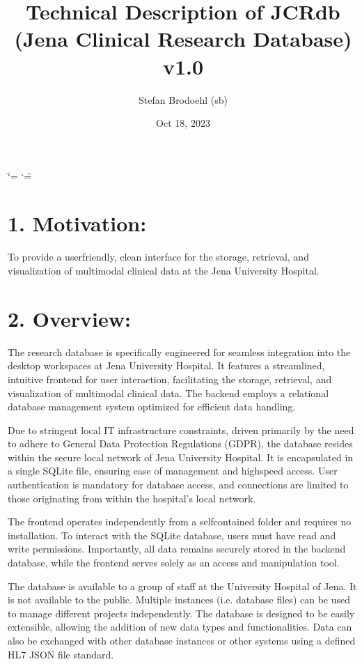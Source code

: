 \documentclass[a4paper,10pt,english]{sphinxmanual}
\title{Technical Description of JCRdb (Jena Clinical Research Database) v1.0}
\date{Oct 18, 2023}
\author{Stefan Brodoehl (sb)}
\begin{document}
\ifdefined\shorthandoff
  \ifnum\catcode`\=\string=\active\shorthandoff{=}\fi
  \ifnum\catcode`\"=\active{}\fi
\fi

\pagestyle{empty}
\sphinxmaketitle
\pagestyle{plain}
\sphinxtableofcontents
\pagestyle{normal}
\label{\detokenize{index::doc}}
\sphinxstepscope




\chapter{1. Motivation:}
\label{\detokenize{TechnicalDetails:motivation}}
\sphinxAtStartPar
To provide a user\sphinxhyphen{}friendly, clean interface for the storage, retrieval, and visualization of multimodal clinical data at the Jena University Hospital.


\chapter{2. Overview:}
\label{\detokenize{TechnicalDetails:overview}}
\sphinxAtStartPar
The research database is specifically engineered for seamless integration into the desktop workspaces at Jena University Hospital. It features a streamlined, intuitive frontend for user interaction, facilitating the storage, retrieval, and visualization of multimodal clinical data. The backend employs a relational database management system optimized for efficient data handling.

\sphinxAtStartPar
Due to stringent local IT infrastructure constraints, driven primarily by the need to adhere to General Data Protection Regulations (GDPR), the database resides within the secure local network of Jena University Hospital. It is encapsulated in a single SQLite file, ensuring ease of management and high\sphinxhyphen{}speed access. User authentication is mandatory for database access, and connections are limited to those originating from within the hospital’s local network.

\sphinxAtStartPar
The frontend operates independently from a self\sphinxhyphen{}contained folder and requires no installation. To interact with the SQLite database, users must have read and write permissions. Importantly, all data remains securely stored in the backend database, while the frontend serves solely as an access and manipulation tool.

\sphinxAtStartPar
The database is available to a group of staff at the University Hospital of Jena. It is not available to the public. Multiple instances (i.e. database files) can be used to manage different projects independently. The database is designed to be easily extensible, allowing the addition of new data types and functionalities. Data can also be exchanged with other database instances or other systems using a defined HL7 JSON file standard.
\end{document}
